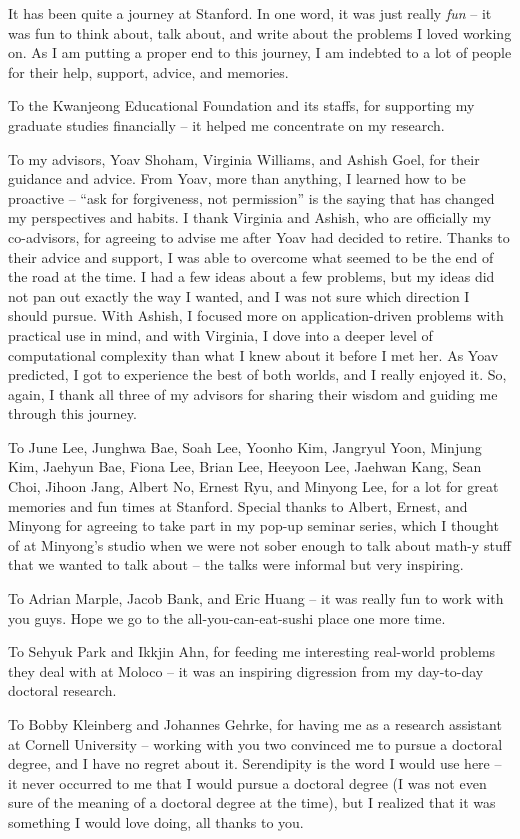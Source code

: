 It has been quite a journey at Stanford.
In one word, it was just really {\em fun} -- it was fun to think about, talk about, and write about the problems I loved working on. 
As I am putting a proper end to this journey, I am indebted to a lot of people for their help, support, advice, and memories.

To the Kwanjeong Educational Foundation and its staffs, for supporting my graduate studies financially -- it helped me concentrate on my research.

To my advisors, Yoav Shoham, Virginia Williams, and Ashish Goel, for their guidance and advice. From Yoav, more than anything, I learned how to be proactive -- ``ask for forgiveness, not permission'' is the saying that has changed my perspectives and habits. I thank Virginia and Ashish, who are officially my co-advisors, for agreeing to advise me after Yoav had decided to retire. Thanks to their advice and support, I was able to overcome what seemed to be the end of the road at the time. I had a few ideas about a few problems, but my ideas did not pan out exactly the way I wanted, and I was not sure which direction I should pursue. With Ashish, I focused more on application-driven problems with practical use in mind, and with Virginia, I dove into a deeper level of computational complexity than what I knew about it before I met her. As Yoav predicted, I got to experience the best of both worlds, and I really enjoyed it. So, again, I thank all three of my advisors for sharing their wisdom and guiding me through this journey.

To June Lee, Junghwa Bae, Soah Lee, Yoonho Kim, Jangryul Yoon, Minjung Kim, Jaehyun Bae, Fiona Lee, Brian Lee, Heeyoon Lee, Jaehwan Kang, Sean Choi, Jihoon Jang, Albert No, Ernest Ryu, and Minyong Lee, for a lot for great memories and fun times at Stanford. Special thanks to Albert, Ernest, and Minyong for agreeing to take part in my pop-up seminar series, which I thought of at Minyong's studio when we were not sober enough to talk about math-y stuff that we wanted to talk about -- the talks were informal but very inspiring. 

To Adrian Marple, Jacob Bank, and Eric Huang -- it was really fun to work with you guys. Hope we go to the all-you-can-eat-sushi place one more time.

To Sehyuk Park and Ikkjin Ahn, for feeding me interesting real-world problems they deal with at Moloco -- it was an inspiring digression from my day-to-day doctoral research.

To Bobby Kleinberg and Johannes Gehrke, for having me as a research assistant at Cornell University -- working with you two convinced me to pursue a doctoral degree, and I have no regret about it. Serendipity is the word I would use here -- it never occurred to me that I would pursue a doctoral degree (I was not even sure of the meaning of a doctoral degree at the time), but I realized that it was something I would love doing, all thanks to you. 

